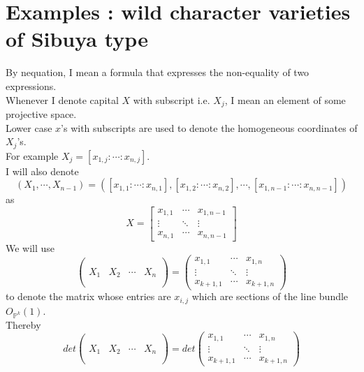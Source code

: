 \section{Examples : wild character varieties of Sibuya type}
By nequation, I mean a formula that expresses the non-equality of two expressions.\\
Whenever I denote capital $X$ with subscript i.e. $X_j$, I mean an element of some projective space.\\
Lower case $x$'s with subscripts are used to denote the homogeneous coordinates of $X_j$'s.\\
For example $X_j=[x_{1,j} : \cdots : x_{n,j}]$.\\
I will also denote
\[
	(X_1,\cdots,X_{n-1})=([x_{1,1}:\cdots:x_{n,1}],[x_{1,2}:				\cdots:x_{n,2}],
	\cdots,
	[x_{1,n-1}:\cdots:x_{n,n-1}])
\] as 
\[
	X
	=
	\begin{bmatrix}
		x_{1,1}&\cdots&x_{1,n-1}\\
		\vdots&\ddots&\vdots\\
		x_{n,1}&\cdots&x_{n,n-1}
	\end{bmatrix}
\]
We will use
\[
		\left( \begin{array}{c|c|c|c}
			& & & \\
			& & & \\
			X_1&X_2&\cdots& X_{n}\\
			& & & \\
			& & &
		\end{array}\right)
		=
		\left( \begin{array}{ccc}
			x_{1,1}&\cdots & x_{1,n} \\
			\vdots&\ddots & \vdots \\
			x_{k+1,1}&\cdots& x_{k+1,n}
		\end{array}\right)
\]
to denote the matrix whose entries are $x_{i,j}$ which are sections of the line bundle $O_{\mathbb{P}^k}(1)$.\\
Thereby
\[
det
		\left(\begin{array}{c|c|c|c}
			& & & \\
			& & & \\
			X_1&X_2&\cdots& X_{n}\\
			& & & \\
			& & &
		\end{array}\right)
		=
		det
		\left( \begin{array}{ccc}
			x_{1,1}&\cdots & x_{1,n} \\
			\vdots&\ddots & \vdots \\
			x_{k+1,1}&\cdots& x_{k+1,n}
		\end{array}\right)
\]
